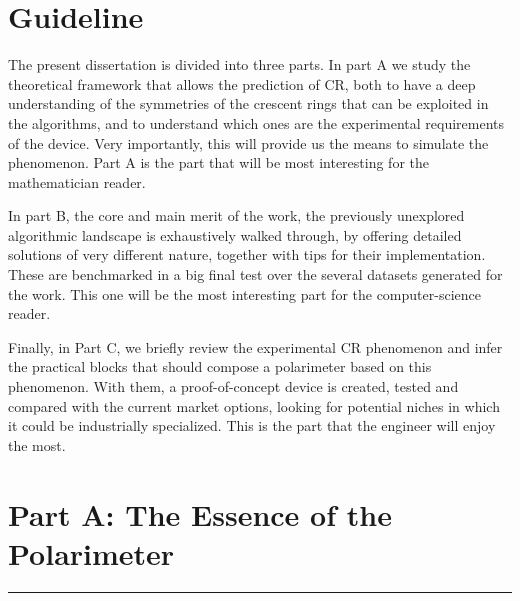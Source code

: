 \documentclass[11pt, a4paper, twoside]{article} %
\begin{document}

\section*{Guideline}\vspace{-0.1cm}
The present dissertation is divided into three parts. In part A we study the theoretical framework that allows the prediction of CR, both to have a deep understanding of the symmetries of the crescent rings that can be exploited in the algorithms, and to understand which ones are the experimental requirements of the device. Very importantly, this will provide us the means to simulate the phenomenon. Part A is the part that will be most interesting for the mathematician reader.

 In part B, the core and main merit of the work, the previously unexplored algorithmic landscape is exhaustively walked through, by offering detailed solutions of very different nature, together with tips for their implementation. These are benchmarked in a big final test over the several datasets generated for the work. This one will be the most interesting part for the computer-science reader.

Finally, in Part C, we briefly review the experimental CR phenomenon and infer the practical blocks that should compose a polarimeter based on this phenomenon. With them, a proof-of-concept device is created, tested and compared with the current market options, looking for potential niches in which it could be industrially specialized. This is the part that the engineer will enjoy the most.



\newpage

\newpage


\newpage

\section*{\centering \huge{Part A: The Essence of the Polarimeter}\vspace{-0.4cm}}
\noindent\rule{\textwidth}{0.4pt}
\vspace{-0.4cm}
\end{document}
